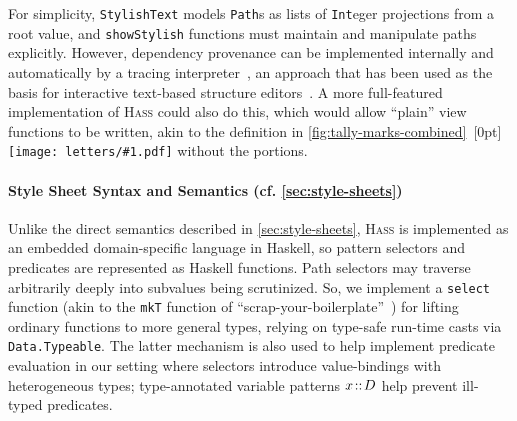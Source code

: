 \documentclass[acmsmall, screen]{acmart}
\newcommand{\parahead}[1]
  {\paragraph{\textbf{#1}}}
\newcommand{\hass}
{\textsc{Hass}}
\newcommand{\varTypeCon}{D}
\newcommand{\hasType}[2]{#1\!::\!#2}
\newcommand{\varPattern}[2]{\hasType{#1}{#2}}
\newcommand{\figBubble}[1]{\raisebox{-0.03in}[0pt]{\texttt{[image: letters/\#1.pdf]}}}
\newcommand{\refBubble}[1]
  {~\figBubble{#1}}
\begin{document}
For simplicity, \texttt{StylishText} models \verb+Path+s as lists of \verb+Int+eger projections from a root value, and \verb+showStylish+ functions must maintain and manipulate paths explicitly.
However, dependency provenance can be implemented internally and automatically by a tracing interpreter~\citep{TML}, an approach that has been used as the basis for interactive text-based structure editors~\citep{hempel2020tiny}.
A more full-featured implementation of \hass{} could also do this, which would allow ``plain'' view functions to be written, akin to the definition in \autoref{fig:tally-marks-combined}\refBubble{b} without the  portions.












\parahead{Style Sheet Syntax and Semantics (cf. \autoref{sec:style-sheets})}



Unlike the direct semantics described in \autoref{sec:style-sheets},
\hass{} is implemented as an embedded domain-specific language in Haskell, so pattern selectors and predicates are represented as Haskell functions.
Path selectors may traverse arbitrarily deeply into subvalues being scrutinized.
So, we implement a \texttt{select} function (akin to the \texttt{mkT} function of ``scrap-your-boilerplate''~\citep{syb}) for lifting ordinary functions to more general types, relying on type-safe run-time casts via \texttt{Data.Typeable}.
The latter mechanism is also used to help implement predicate evaluation in our setting where selectors introduce value-bindings with heterogeneous types;
type-annotated variable patterns $\varPattern{\varVar}{\varTypeCon}$ help prevent ill-typed predicates.
\end{document}
